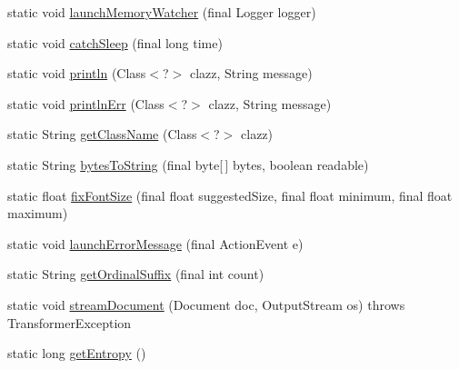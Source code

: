 \begin{DoxyCompactItemize}
\item 
static void \hyperlink{classgov_1_1fnal_1_1ppd_1_1dd_1_1util_1_1nonguiUtils_1_1GeneralUtilities_a8c23cc2e0f360c1ec8edf7301790a7a9}{launch\-Memory\-Watcher} (final Logger logger)
\item 
static void \hyperlink{classgov_1_1fnal_1_1ppd_1_1dd_1_1util_1_1nonguiUtils_1_1GeneralUtilities_a659fea65836f77255e47394f3ccdd411}{catch\-Sleep} (final long time)
\item 
static void \hyperlink{classgov_1_1fnal_1_1ppd_1_1dd_1_1util_1_1nonguiUtils_1_1GeneralUtilities_ab1ab6769cdb085fc17a48195da426c81}{println} (Class$<$?$>$ clazz, String message)
\item 
static void \hyperlink{classgov_1_1fnal_1_1ppd_1_1dd_1_1util_1_1nonguiUtils_1_1GeneralUtilities_a5c393ea898b3618065d21539c6f4bc0b}{println\-Err} (Class$<$?$>$ clazz, String message)
\item 
static String \hyperlink{classgov_1_1fnal_1_1ppd_1_1dd_1_1util_1_1nonguiUtils_1_1GeneralUtilities_a6a4a5c0040bbfab986ee94215f59ba11}{get\-Class\-Name} (Class$<$?$>$ clazz)
\item 
static String \hyperlink{classgov_1_1fnal_1_1ppd_1_1dd_1_1util_1_1nonguiUtils_1_1GeneralUtilities_a5b74a0cc0ff9fdc6681d07ecccc28af6}{bytes\-To\-String} (final byte\mbox{[}$\,$\mbox{]} bytes, boolean readable)
\item 
static float \hyperlink{classgov_1_1fnal_1_1ppd_1_1dd_1_1util_1_1nonguiUtils_1_1GeneralUtilities_a82609497462335ce2ea9ed61beec42b3}{fix\-Font\-Size} (final float suggested\-Size, final float minimum, final float maximum)
\item 
static void \hyperlink{classgov_1_1fnal_1_1ppd_1_1dd_1_1util_1_1nonguiUtils_1_1GeneralUtilities_a71e9cabd56310a2a9c4fe6c4063a0e7c}{launch\-Error\-Message} (final Action\-Event e)
\item 
static String \hyperlink{classgov_1_1fnal_1_1ppd_1_1dd_1_1util_1_1nonguiUtils_1_1GeneralUtilities_ae7d9951d63ab4a0d6bc07299db31c59e}{get\-Ordinal\-Suffix} (final int count)
\item 
static void \hyperlink{classgov_1_1fnal_1_1ppd_1_1dd_1_1util_1_1nonguiUtils_1_1GeneralUtilities_ab8d4b0f08c45693ef52e8bfbda54bcdd}{stream\-Document} (Document doc, Output\-Stream os)  throws Transformer\-Exception 
\item 
\hypertarget{classgov_1_1fnal_1_1ppd_1_1dd_1_1util_1_1nonguiUtils_1_1GeneralUtilities_ac53debfa3a7dacdf09e5d436881e476d}{static long \hyperlink{classgov_1_1fnal_1_1ppd_1_1dd_1_1util_1_1nonguiUtils_1_1GeneralUtilities_ac53debfa3a7dacdf09e5d436881e476d}{get\-Entropy} ()}\label{classgov_1_1fnal_1_1ppd_1_1dd_1_1util_1_1nonguiUtils_1_1GeneralUtilities_ac53debfa3a7dacdf09e5d436881e476d}


\end{DoxyCompactItemize}
